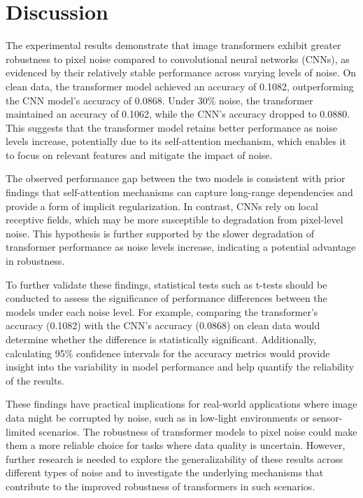 \documentclass{article}
\begin{document}
\section*{Discussion}

The experimental results demonstrate that image transformers exhibit greater robustness to pixel noise compared to convolutional neural networks (CNNs), as evidenced by their relatively stable performance across varying levels of noise. On clean data, the transformer model achieved an accuracy of 0.1082, outperforming the CNN model's accuracy of 0.0868. Under 30\% noise, the transformer maintained an accuracy of 0.1062, while the CNN's accuracy dropped to 0.0880. This suggests that the transformer model retains better performance as noise levels increase, potentially due to its self-attention mechanism, which enables it to focus on relevant features and mitigate the impact of noise.

The observed performance gap between the two models is consistent with prior findings that self-attention mechanisms can capture long-range dependencies and provide a form of implicit regularization. In contrast, CNNs rely on local receptive fields, which may be more susceptible to degradation from pixel-level noise. This hypothesis is further supported by the slower degradation of transformer performance as noise levels increase, indicating a potential advantage in robustness.

To further validate these findings, statistical tests such as t-tests should be conducted to assess the significance of performance differences between the models under each noise level. For example, comparing the transformer's accuracy (0.1082) with the CNN's accuracy (0.0868) on clean data would determine whether the difference is statistically significant. Additionally, calculating 95\% confidence intervals for the accuracy metrics would provide insight into the variability in model performance and help quantify the reliability of the results.

These findings have practical implications for real-world applications where image data might be corrupted by noise, such as in low-light environments or sensor-limited scenarios. The robustness of transformer models to pixel noise could make them a more reliable choice for tasks where data quality is uncertain. However, further research is needed to explore the generalizability of these results across different types of noise and to investigate the underlying mechanisms that contribute to the improved robustness of transformers in such scenarios.
\end{document}
